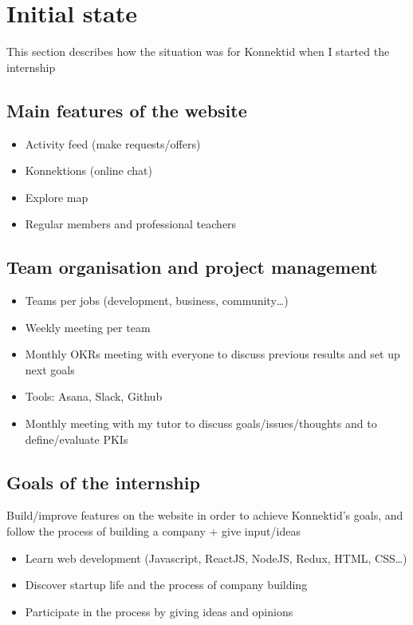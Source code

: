 \section{Initial state}
\label{sec:initial}

This section describes how the situation was for Konnektid when I started the internship

\subsection{Main features of the website}
\label{ssec:features}

\begin{itemize}
\item Activity feed (make requests/offers)
\item Konnektions (online chat)
\item Explore map
\item Regular members and professional teachers
\end{itemize}

\subsection{Team organisation and project management}
\label{ssec:management}

\begin{itemize}
\item Teams per jobs (development, business, community\ldots)
\item Weekly meeting per team
\item Monthly OKRs meeting with everyone to discuss previous results and set up next goals
\item Tools: Asana, Slack, Github
\item Monthly meeting with my tutor to discuss goals/issues/thoughts and to define/evaluate PKIs
\end{itemize}

\subsection{Goals of the internship}
\label{ssec:goals}

Build/improve features on the website in order to achieve
Konnektid's goals, and follow the process of building a company + give input/ideas

\begin{itemize}
\item Learn web development (Javascript, ReactJS, NodeJS, Redux, HTML, CSS\ldots)
\item Discover startup life and the process of company building
\item Participate in the process by giving ideas and opinions
\end{itemize}
